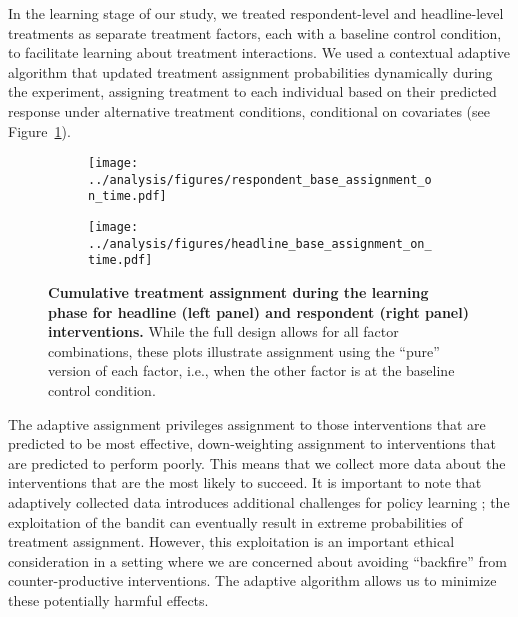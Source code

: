 \documentclass[letterpaper, 12pt, parskip=full,DIV=10]{scrartcl}
\begin{document}
In the learning stage of our study, we treated respondent-level and headline-level treatments as separate treatment factors, each with a baseline control condition, to facilitate learning about treatment interactions. We used a contextual adaptive algorithm that updated treatment assignment probabilities dynamically during the experiment, assigning treatment to each individual based on their predicted response under alternative treatment conditions, conditional on covariates (see Figure~\ref{fig:learning_cumulative}). 

\begin{figure}[H]
\centering
\begin{subfigure}[b]{0.5\textwidth}
        \centering
        \texttt{[image: ../analysis/figures/respondent\_base\_assignment\_on\_time.pdf]}
    \end{subfigure}%
    \begin{subfigure}[b]{0.5\textwidth}
        \centering
        \texttt{[image: ../analysis/figures/headline\_base\_assignment\_on\_time.pdf]}
    \end{subfigure}
   \caption{\textbf{Cumulative treatment assignment during the learning phase for headline (left panel) and respondent (right panel) interventions.} While the full design allows for all factor combinations, these plots illustrate assignment using the ``pure'' version of each factor, i.e., when the other factor is at the baseline control condition.}
   \label{fig:learning_cumulative}
\end{figure}


The adaptive assignment privileges assignment to those interventions that are predicted to be most effective, down-weighting assignment to interventions that are predicted to perform poorly. This means that we collect more data about the interventions that are the most likely to succeed. It is important to note that adaptively collected data introduces additional challenges for policy learning \citep{zhan2021policy}; the exploitation of the bandit can eventually result in extreme probabilities of treatment assignment. However, this exploitation is an important ethical consideration in a setting where we are concerned about avoiding ``backfire'' from counter-productive interventions. The adaptive algorithm allows us to minimize these potentially harmful effects. %

\end{document}

